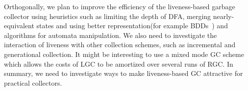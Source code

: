 \documentclass[9pt,preprint,letter,nonatbib]{sigplanconf}
\begin{document}
  Orthogonally,   we   plan  to   improve   the   efficiency  of   the
  liveness-based garbage  collector using heuristics such  as limiting
  the depth of DFA, merging  nearly-equivalent states and using better
  representation(for example BDDs~\cite{Bryant86})  and algorithms for
  automata manipulation.  We also  need to investigate the interaction
  of liveness with  other collection schemes, such  as incremental and
  generational collection.   It might  be interesting  to use  a mixed
  mode GC  scheme which allows the  costs of LGC to  be amortized over
  several runs of RGC. In summary, we need to investigate ways to make
  liveness-based GC attractive for practical collectors.


\clearpage
\balance
{}

\clearpage

\appendix
\end{document}
